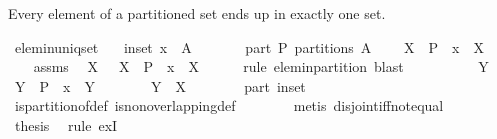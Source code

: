 \begin{isabellebody}
\begin{isamarkuptext}
Every element of a partitioned set ends up in exactly one set.%
\end{isamarkuptext}%
\isamarkuptrue%
\isamarkupfalse%
\ elem{\isacharunderscore}in{\isacharunderscore}uniq{\isacharunderscore}set{\isacharcolon}\isanewline
\ \ \ in{\isacharunderscore}set{\isacharcolon}\ {\isachardoublequoteopen}x\ {\isasymin}\ A{\isachardoublequoteclose}\isanewline
\ \ \ \ \ \ \ part{\isacharcolon}\ {\isachardoublequoteopen}P\ partitions\ A{\isachardoublequoteclose}\isanewline
\ \ \ {\isachardoublequoteopen}{\isasymexists}{\isacharbang}\ X\ {\isasymin}\ P\ {\isachardot}\ x\ {\isasymin}\ X{\isachardoublequoteclose}\isanewline
%
\isadelimproof
%
\endisadelimproof
%
\isatagproof
{}\isamarkupfalse%
\ {\isacharminus}\isanewline
\ \ \isamarkupfalse%
\ assms\ \isamarkupfalse%
\ X\ \ {\isacharasterisk}{\isacharcolon}\ {\isachardoublequoteopen}X\ {\isasymin}\ P\ {\isasymand}\ x\ {\isasymin}\ X{\isachardoublequoteclose}\isanewline
\ \ \ \ \isamarkupfalse%
\ {\isacharparenleft}rule\ elem{\isacharunderscore}in{\isacharunderscore}partition{\isacharparenright}\ blast\isanewline
\ \ \isamarkupfalse%
\ \isacommand{{\isacharbraceleft}}\isamarkupfalse%
\isanewline
\ \ \ \ \isamarkupfalse%
\ Y\ \isamarkupfalse%
\ {\isachardoublequoteopen}Y\ {\isasymin}\ P\ {\isasymand}\ x\ {\isasymin}\ Y{\isachardoublequoteclose}\isanewline
\ \ \ \ \isamarkupfalse%
\ \isamarkupfalse%
\ {\isachardoublequoteopen}Y\ {\isacharequal}\ X{\isachardoublequoteclose}\isanewline
\ \ \ \ \ \ \isamarkupfalse%
\ part\ in{\isacharunderscore}set\ {\isacharasterisk}\isanewline
\ \ \ \ \ \ \isamarkupfalse%
\ is{\isacharunderscore}partition{\isacharunderscore}of{\isacharunderscore}def\ is{\isacharunderscore}non{\isacharunderscore}overlapping{\isacharunderscore}def\isanewline
\ \ \ \ \ \ \isamarkupfalse%
\ {\isacharparenleft}metis\ disjoint{\isacharunderscore}iff{\isacharunderscore}not{\isacharunderscore}equal{\isacharparenright}\isanewline
\ \ \isacommand{{\isacharbraceright}}\isamarkupfalse%
\isanewline
\ \ \isamarkupfalse%
\ \isamarkupfalse%
\ {\isacharquery}thesis\ \isamarkupfalse%
\ {\isacharparenleft}rule\ ex{}I{\isacharparenright}\isanewline
{}\isamarkupfalse%
%
\endisatagproof
{\isafoldproof}%
%
\isadelimproof

\end{isabellebody}

